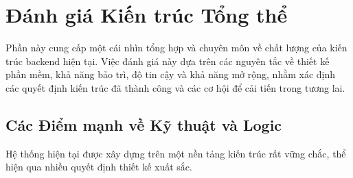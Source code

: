 \section{Đánh giá Kiến trúc Tổng thể}
\label{sec:kien-truc-tong-the}

Phần này cung cấp một cái nhìn tổng hợp và chuyên môn về chất lượng của kiến trúc backend hiện tại. Việc đánh giá này dựa trên các nguyên tắc về thiết kế phần mềm, khả năng bảo trì, độ tin cậy và khả năng mở rộng, nhằm xác định các quyết định kiến trúc đã thành công và các cơ hội để cải tiến trong tương lai.

\subsection{Các Điểm mạnh về Kỹ thuật và Logic}
\label{subsec:diem-manh}

Hệ thống hiện tại được xây dựng trên một nền tảng kiến trúc rất vững chắc, thể hiện qua nhiều quyết định thiết kế xuất sắc.

